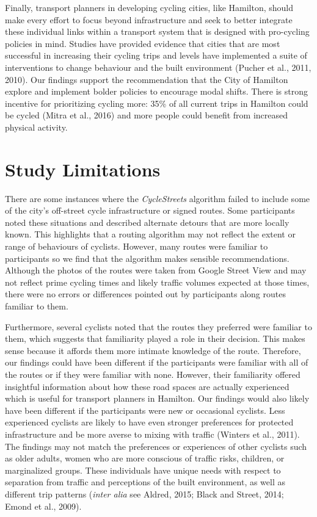 \documentclass[]{elsarticle} %
\begin{document}
Finally, transport planners in developing cycling cities, like Hamilton,
should make every effort to focus beyond infrastructure and seek to
better integrate these individual links within a transport system that
is designed with pro-cycling policies in mind. Studies have provided
evidence that cities that are most successful in increasing their
cycling trips and levels have implemented a suite of interventions to
change behaviour and the built environment (Pucher et al., 2011, 2010).
Our findings support the recommendation that the City of Hamilton
explore and implement bolder policies to encourage modal shifts. There
is strong incentive for prioritizing cycling more: 35\% of all current
trips in Hamilton could be cycled (Mitra et al., 2016) and more people
could benefit from increased physical activity.

\hypertarget{sec:limitations}{%
\section{Study Limitations}\label{sec:limitations}}

There are some instances where the \emph{CycleStreets} algorithm failed
to include some of the city's off-street cycle infrastructure or signed
routes. Some participants noted these situations and described alternate
detours that are more locally known. This highlights that a routing
algorithm may not reflect the extent or range of behaviours of cyclists.
However, many routes were familiar to participants so we find that the
algorithm makes sensible recommendations. Although the photos of the
routes were taken from Google Street View and may not reflect prime
cycling times and likely traffic volumes expected at those times, there
were no errors or differences pointed out by participants along routes
familiar to them.

Furthermore, several cyclists noted that the routes they preferred were
familiar to them, which suggests that familiarity played a role in their
decision. This makes sense because it affords them more intimate
knowledge of the route. Therefore, our findings could have been
different if the participants were familiar with all of the routes or if
they were familiar with none. However, their familiarity offered
insightful information about how these road spaces are actually
experienced which is useful for transport planners in Hamilton. Our
findings would also likely have been different if the participants were
new or occasional cyclists. Less experienced cyclists are likely to have
even stronger preferences for protected infrastructure and be more
averse to mixing with traffic (Winters et al., 2011). The findings may
not match the preferences or experiences of other cyclists such as older
adults, women who are more conscious of traffic risks, children, or
marginalized groups. These individuals have unique needs with respect to
separation from traffic and perceptions of the built environment, as
well as different trip patterns (\emph{inter alia} see Aldred, 2015;
Black and Street, 2014; Emond et al., 2009).
\end{document}

